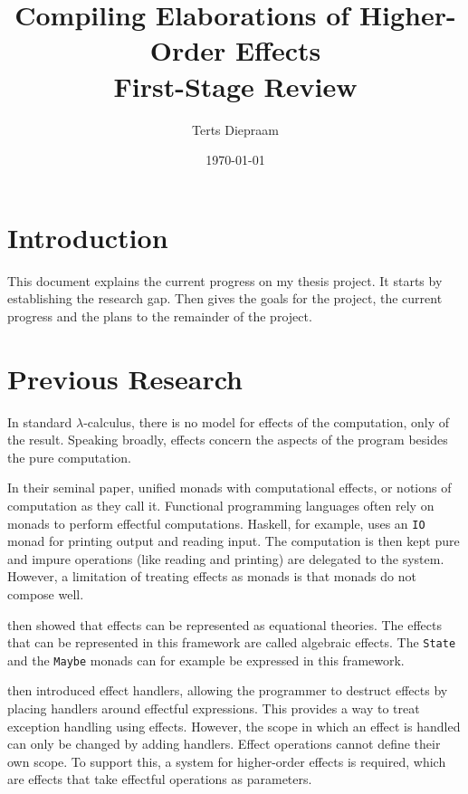 \documentclass{article}
\title{Compiling Elaborations of Higher-Order Effects\\First-Stage Review}
\author{Terts Diepraam}
\date{\today}
\begin{document}
\maketitle

\section{Introduction}

This document explains the current progress on my thesis project. It starts by establishing the research gap. Then gives the goals for the project, the current progress and the plans to the remainder of the project.

\section{Previous Research}

In standard $\lambda$-calculus, there is no model for effects of the computation, only of the result. Speaking broadly, effects concern the aspects of the program besides the pure computation. \cite{moggi_computational_1989}

In their seminal paper, \textcite{moggi_computational_1989} unified monads with computational effects, or notions of computation as they call it. Functional programming languages often rely on monads to perform effectful computations. Haskell, for example, uses an \texttt{IO} monad for printing output and reading input. The computation is then kept pure and impure operations (like reading and printing) are delegated to the system. However, a limitation of treating effects as monads is that monads do not compose well.

\textcite{goos_adequacy_2001} then showed that effects can be represented as equational theories. The effects that can be represented in this framework are called algebraic effects. The \texttt{State} and the \texttt{Maybe} monads can for example be expressed in this framework.

\textcite{castagna_handlers_2009} then introduced effect handlers, allowing the programmer to destruct effects by placing handlers around effectful expressions. This provides a way to treat exception handling using effects. However, the scope in which an effect is handled can only be changed by adding handlers. Effect operations cannot define their own scope. To support this, a system for higher-order effects is required, which are effects that take effectful operations as parameters.
\end{document}
